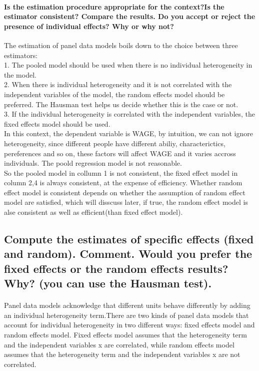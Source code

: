 \documentclass{article}
\begin{document}
\paragraph{Is the estimation procedure appropriate for the context?Is the estimator consistent? Compare the results. Do you accept or reject the presence of individual effects? Why or why not?\\}
The estimation of panel data models boils down to the choice between three estimators:\\
1. The pooled model should be used when there is no individual heterogeneity in the model.\\
2. When there is individual heterogeneity and it is not correlated with the independent variables of the model, the random effects model should be preferred. The Hausman test helps us decide
whether this is the case or not. \\
3. If the individual heterogeneity is correlated with the independent variables, the fixed effects model should be used.\\
In this context, the dependent variable is WAGE, by intuition, we can not ignore heterogeneity, since different people have different abiliy, characterictics, pereferences and so on, these factors will affect WAGE and it varies accross individuals. The poold regression model is not reasonable.\\
So the pooled model in collumn 1 is not consistent, the fixed effect model in column 2,4 is always consistent, at the expense of efficiency. Whether random effect model is consistent depends on whether the assumption of random effect model are satisfied, which will disscuss later, if true, the random effect model is alse consistent as well as efficient(than fixed effect model).

\subsection{Compute the estimates of specific effects (fixed and random). Comment. Would you prefer the fixed effects or the random effects results? Why? (you can use the Hausman test).}
\paragraph{} Panel data models acknowledge that different units behave differently by adding an individual heterogeneity term.There are two kinds of panel data models that account for individual heterogeneity in two different ways: fixed effects model and random effects model. Fixed effects model assumes that the heterogeneity term and the independent variables x are correlated, while random effects model assumes that the heterogeneity term and the independent variables x are not correlated.
\end{document}
